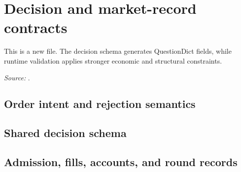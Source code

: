 \section{Decision and market-record contracts}
This is a new file. The decision schema generates QuestionDict fields, while runtime validation applies stronger economic and structural constraints.
\par\textit{Source:} .
\def\activefile{records}
\subsection{Order intent and rejection semantics}

\subsection{Shared decision schema}

\subsection{Admission, fills, accounts, and round records}

